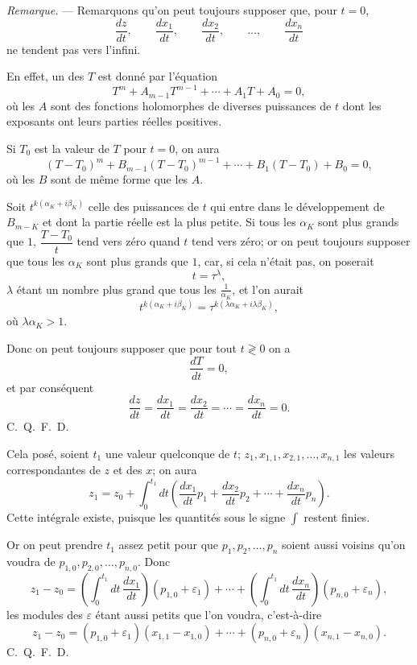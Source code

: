\documentclass[11pt]{article}
\begin{document}
\emph{Remarque.} --- Remarquons qu’on peut toujours supposer que, pour $t=0$,
\[
\frac{dz}{dt},\qquad \frac{dx_1}{dt},\qquad \frac{dx_2}{dt},\qquad \ldots,
\qquad \frac{dx_n}{dt}
\]
ne tendent pas vers l’infini.

En effet, un des $T$ est donné par l’équation
\begin{equation*}\tag{39}
T^m+A_{m-1}T^{m-1}+\cdots+A_1T+A_0=0,
\end{equation*}
où les $A$ sont des fonctions holomorphes de diverses puissances de $t$ dont les exposants ont leurs parties réelles positives.

Si $T_0$ est la valeur de $T$ pour $t=0$, on aura
\[
(T-T_0)^m+B_{m-1}(T-T_0)^{m-1}+\cdots+B_1(T-T_0)+B_0=0,
\]
où les $B$ sont de même forme que les $A$.

Soit $t^{k(\alpha_K+i\beta_K)}$ celle des puissances de $t$ qui entre dans le développement de $B_{m-K}$ et dont la partie réelle est la plus petite. Si tous les $\alpha_K$ sont plus grands que $1$, $\dfrac{T-T_0}{t}$ tend vers zéro quand $t$ tend vers zéro; or on peut toujours supposer que tous les $\alpha_K$ sont plus grands que $1$, car, si cela n’était pas, on poserait
\[
t=\tau^\lambda,
\]
$\lambda$ étant un nombre plus grand que tous les $\frac1{\alpha_K}$, et l’on aurait
\[
t^{k(\alpha_K+i\beta_K)}=\tau^{k(\lambda\alpha_K+i\lambda\beta_K)},
\]
où $\lambda\alpha_K>1$.

Donc on peut toujours supposer que pour tout $t\gtrless0$ on a
\[
\frac{dT}{dt}=0,
\]
et par conséquent
\[
\frac{dz}{dt}=\frac{dx_1}{dt}=\frac{dx_2}{dt}=\cdots=\frac{dx_n}{dt}=0.
\]
\hfill\mbox{C. Q. F. D.}

Cela posé, soient $t_1$ une valeur quelconque de $t$; $z_1,x_{1,1},x_{2,1},\ldots,x_{n,1}$ les valeurs correspondantes de $z$ et des $x$; on aura
\[
z_1=z_0+\int_0^{t_1}dt\left(\frac{dx_1}{dt}p_1+\frac{dx_2}{dt}p_2+\cdots+\frac{dx_n}{dt}p_n\right).
\]
Cette intégrale existe, puisque les quantités sous le signe $\int$ restent finies.

Or on peut prendre $t_1$ assez petit pour que $p_1,p_2,\ldots,p_n$ soient aussi voisins qu’on voudra de $p_{1,0},p_{2,0},\ldots,p_{n,0}$. Donc
\[
z_1-z_0=\left(\int_0^{t_1}dt\,\frac{dx_1}{dt}\right)(p_{1,0}+\varepsilon_1)+\cdots+\left(\int_0^{t_1}dt\,\frac{dx_n}{dt}\right)(p_{n,0}+\varepsilon_n),
\]
les modules des $\varepsilon$ étant aussi petits que l’on voudra, c’est-à-dire
\[
z_1-z_0=(p_{1,0}+\varepsilon_1)(x_{1,1}-x_{1,0})+\cdots+(p_{n,0}+\varepsilon_n)(x_{n,1}-x_{n,0}).
\]
\hfill\mbox{C. Q. F. D.}
\end{document}

